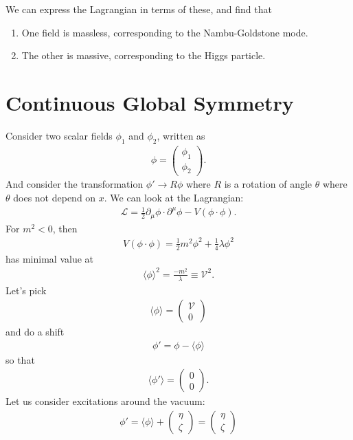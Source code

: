 \documentclass{book}
\numberwithin{equation}{section}
\theoremstyle{definition}
\newcommand{\p}{\partial}
\newcommand{\lag}{\mathcal{L}}
\begin{document}
We can express the Lagrangian in terms of these, and find that 
\begin{enumerate}
	\item One field is massless, corresponding to the Nambu-Goldstone mode.
	\item The other is massive, corresponding to the Higgs particle. 
\end{enumerate}


\section{Continuous Global Symmetry}
Consider two scalar fields $\phi_1$ and $\phi_2$, written as
\begin{align}
\phi = \begin{pmatrix}
\phi_1 \\ \phi_2
\end{pmatrix}.
\end{align}
And consider the transformation $\phi' \to R\phi$ where $R$ is a rotation of angle $\theta$ where $\theta$ does not depend on $x$. We can look at the Lagrangian:
\begin{align}
\lag = \frac{1}{2}\p_\mu \phi \cdot \p^\mu \phi - V(\phi \cdot \phi).
\end{align}
For $m^2 < 0$, then 
\begin{align}
V(\phi\cdot \phi) = \frac{1}{2}m^2 \phi^2 + \frac{1}{4}\lambda\phi^2
\end{align}
has minimal value at
\begin{align}
\langle \phi \rangle^2 = \frac{-m^2}{\lambda} \equiv \mathcal{V}^2.
\end{align}
Let's pick 
\begin{align}
\langle \phi \rangle = \begin{pmatrix}
\mathcal{V}\\0
\end{pmatrix}
\end{align}
and do a shift
\begin{align}
\phi' = \phi - \langle \phi \rangle
\end{align}
so that 
\begin{align}
\langle \phi' \rangle = \begin{pmatrix}
0\\0
\end{pmatrix}.
\end{align}
Let us consider excitations around the vacuum:
\begin{align}
\phi' = \langle \phi \rangle + \begin{pmatrix}
\eta \\\zeta
\end{pmatrix} = \begin{pmatrix}
\eta \\ \zeta
\end{pmatrix}
\end{align}
\end{document}
